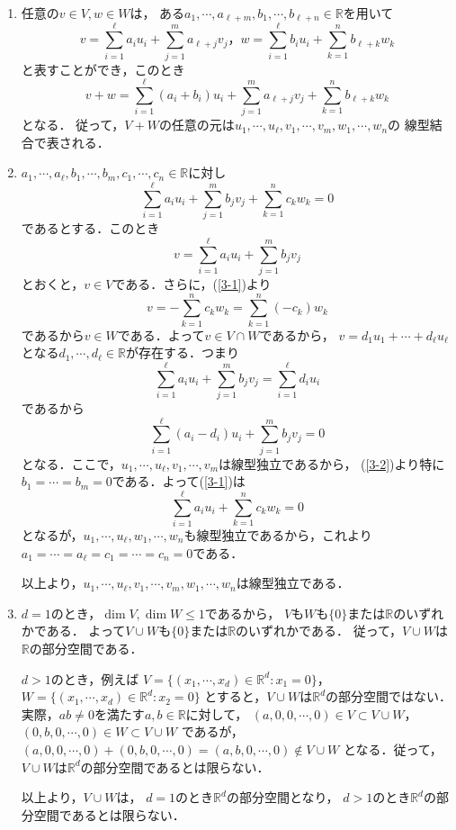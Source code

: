 \documentclass{jsarticle}
\theoremstyle{definition}
\begin{document}
\begin{enumerate}
\item 任意の$v\in V,w\in W$は，
ある$a_1,\cdots,a_{\ell+m},b_1,\cdots,b_{\ell+n}\in\mathbb{R}$を用いて
\[ v=\sum_{i=1}^\ell a_iu_i+\sum_{j=1}^ma_{\ell+j}v_j，
w=\sum_{i=1}^\ell b_iu_i+\sum_{k=1}^nb_{\ell+k}w_k \]
と表すことができ，このとき
\[ v+w=\sum_{i=1}^\ell(a_i+b_i)u_i+\sum_{j=1}^ma_{\ell+j}v_j+\sum_{k=1}^nb_{\ell+k}w_k \]
となる．
従って，$V+W$の任意の元は$u_1,\cdots,u_\ell,v_1,\cdots,v_m,w_1,\cdots,w_n$の
線型結合で表される．

\item$a_1,\cdots,a_\ell,b_1,\cdots,b_m,c_1,\cdots,c_n\in\mathbb{R}$に対し
\begin{equation}\label{3-1}
\sum_{i=1}^\ell a_iu_i+\sum_{j=1}^mb_jv_j+\sum_{k=1}^nc_kw_k=0
\end{equation}
であるとする．このとき
\[ v=\sum_{i=1}^\ell a_iu_i+\sum_{j=1}^mb_jv_j \]
とおくと，$v\in V$である．さらに，(\ref{3-1})より
\[ v=-\sum_{k=1}^nc_kw_k=\sum_{k=1}^n(-c_k)w_k \]
であるから$v\in W$である．よって$v\in V\cap W$であるから，
$v=d_1u_1+\cdots+d_\ell u_\ell$となる$d_1,\cdots,d_\ell\in\mathbb{R}$が存在する．つまり
\[ \sum_{i=1}^\ell a_iu_i+\sum_{j=1}^mb_jv_j=\sum_{i=1}^\ell d_iu_i \]
であるから
\begin{equation}\label{3-2}
\sum_{i=1}^\ell(a_i-d_i)u_i+\sum_{j=1}^mb_jv_j=0
\end{equation}
となる．ここで，$u_1,\cdots,u_\ell,v_1,\cdots,v_m$は線型独立であるから，
(\ref{3-2})より特に$b_1=\cdots=b_m=0$である．よって(\ref{3-1})は
\[ \sum_{i=1}^\ell a_iu_i+\sum_{k=1}^nc_kw_k=0 \]
となるが，$u_1,\cdots,u_\ell,w_1,\cdots,w_n$も線型独立であるから，これより
$a_1=\cdots=a_\ell=c_1=\cdots=c_n=0$である．

以上より，$u_1,\cdots,u_\ell,v_1,\cdots,v_m,w_1,\cdots,w_n$は線型独立である．

\item$d=1$のとき，$\dim{V},\dim{W}\leq1$であるから，
$V$も$W$も$\{0\}$または$\mathbb{R}$のいずれかである．
よって$V\cup W$も$\{0\}$または$\mathbb{R}$のいずれかである．
従って，$V\cup W$は$\mathbb{R}$の部分空間である．

$d>1$のとき，例えば
$V=\{(x_1,\cdots,x_d)\in\mathbb{R}^d:x_1=0\}$，
$W=\{(x_1,\cdots,x_d)\in\mathbb{R}^d:x_2=0\}$
とすると，$V\cup W$は$\mathbb{R}^d$の部分空間ではない．
実際，$ab\neq0$を満たす$a,b\in\mathbb{R}$に対して，
$(a,0,0,\cdots,0)\in V\subset V\cup W$，$(0,b,0,\cdots,0)\in W\subset V\cup W$
であるが，
$(a,0,0,\cdots,0)+(0,b,0,\cdots,0)=(a,b,0,\cdots,0)\notin V\cup W$
となる．従って，$V\cup W$は$\mathbb{R}^d$の部分空間であるとは限らない．

以上より，$V\cup W$は，
$d=1$のとき$\mathbb{R}^d$の部分空間となり，
$d>1$のとき$\mathbb{R}^d$の部分空間であるとは限らない．
\end{enumerate}
\end{document}

